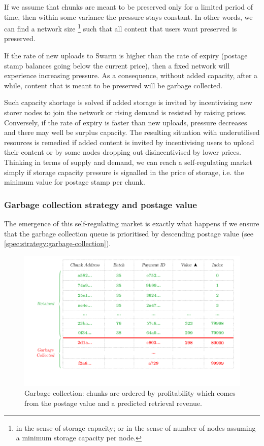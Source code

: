 If we assume that chunks are meant to be preserved only for a limited period of time, then within some variance the pressure stays constant. In other words, we can find a network size%
%
\footnote{in the sense of storage capacity; or in the sense of number of nodes assuming a minimum storage capacity per node.}
%
such that all content that users want preserved is preserved. 

If the rate of new uploads to Swarm is higher than the rate of expiry (postage stamp balances going below the current price), then a fixed network will experience increasing pressure. As a consequence, without added capacity, after a while, content that is meant to be preserved will be garbage collected. 

Such capacity shortage is solved if added storage is invited by incentivising new storer nodes to join the network or rising demand is resisted by raising prices. Conversely, if the rate of expiry is faster than new uploads, pressure decreases and there may well be surplus capacity. The resulting situation with underutilised resources is remedied if added content is invited by incentivising users to upload their content or by some nodes dropping out disincentivised by lower prices. Thinking in terms of supply and demand, we can reach a self-regulating market simply if storage capacity pressure is signalled in the price of storage, i.e. the minimum value for postage stamp per chunk. 

\subsubsection{Garbage collection strategy and postage value}

The emergence of this self-regulating market is exactly what happens if we ensure that the garbage collection queue is prioritised by descending postage value (see \ref{spec:strategy:garbage-collection}).

\begin{figure}[htbp]
  \centering
  \includegraphics[width=\textwidth]{fig/garbage-collection-fixed.pdf}
  \caption[Garbage collection \statusgreen]{Garbage collection: chunks are ordered by profitability which comes from the postage value and a predicted retrieval revenue.}
  \label{fig:garbage-collection}
\end{figure}


